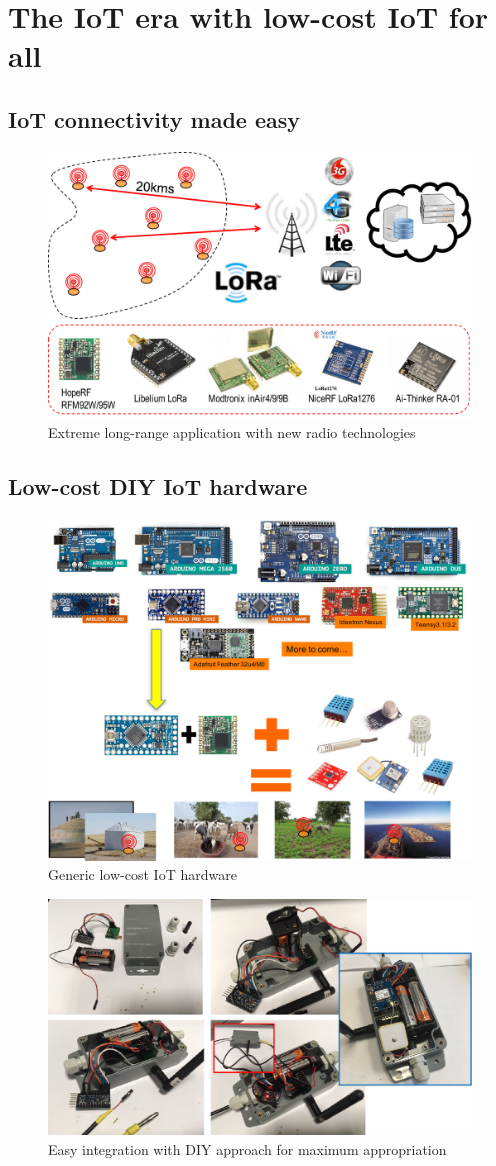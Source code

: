 \section{The IoT era with low-cost IoT for all}

\subsection{IoT connectivity made easy}

\begin{figure}  
\centering  
\includegraphics[width=.65\linewidth]{figures/1-hop}   
\caption{Extreme long-range application with new radio technologies}   
\label{figure-1hop}  
\end{figure} 

\subsection{Low-cost DIY IoT hardware}

\begin{figure}  
\centering  
\includegraphics[width=.65\linewidth]{figures/generic-iot}   
\caption{Generic low-cost IoT hardware}   
\label{figure-generic-iot}  
\end{figure} 

\begin{figure} 
\centering  
\includegraphics[width=.65\linewidth]{figures/easy-integration}   
\caption{Easy integration with DIY approach for maximum appropriation}   
\label{figure-easy-integration}  
\end{figure} 
